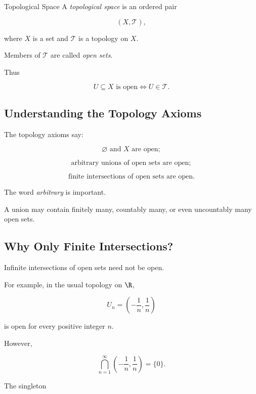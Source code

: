 \begin{definitionbox}{Topological Space}
A \emph{topological space} is an ordered pair

\[
\boxed{
(X,\mathcal{T}),
}
\]

where \(X\) is a set and \(\mathcal{T}\) is a topology on \(X\).
\end{definitionbox}

Members of \(\mathcal{T}\) are called \emph{open sets}.

Thus

\[
\boxed{
U\subseteq X
\text{ is open}
\iff
U\in\mathcal{T}.
}
\]

\subsection{Understanding the Topology Axioms}
\label{subsec:topology-axioms-meaning}

The topology axioms say:

\[
\boxed{
\varnothing\text{ and }X\text{ are open};
}
\]

\[
\boxed{
\text{arbitrary unions of open sets are open};
}
\]

\[
\boxed{
\text{finite intersections of open sets are open}.
}
\]

The word \emph{arbitrary} is important.

A union may contain finitely many, countably many, or even uncountably many
open sets.

\subsection{Why Only Finite Intersections?}
\label{subsec:finite-intersections-only}

Infinite intersections of open sets need not be open.

For example, in the usual topology on \(\R\),

\[
U_n
=
\left(
-\frac1n,\frac1n
\right)
\]

is open for every positive integer \(n\).

However,

\[
\bigcap_{n=1}^{\infty}
\left(
-\frac1n,\frac1n
\right)
=
\{0\}.
\]

The singleton

